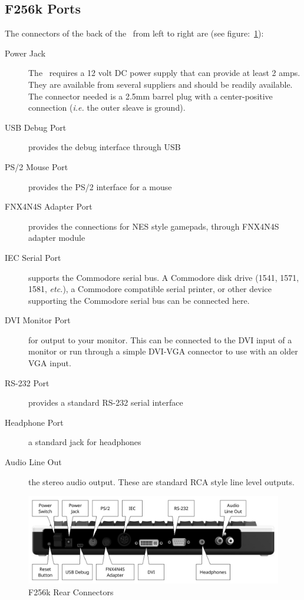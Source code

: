 \subsection*{F256k Ports}

The connectors of the back of the \fk\ from left to right are (see figure:~\ref{fig:rear_k}):

\begin{description}
	\item[Power Jack] The \fk\ requires a 12 volt DC power supply that can provide at least 2 amps. They are available from several suppliers and should be readily available. The connector needed is a 2.5mm barrel plug with a center-positive connection ({\it i.e.} the outer sleave is ground).
	
	\item[USB Debug Port] provides the debug interface through USB
    
    \item[PS/2 Mouse Port] provides the PS/2 interface for a mouse
    
    \item[FNX4N4S Adapter Port] provides the connections for NES style gamepads, through FNX4N4S adapter module
    
    \item[IEC Serial Port] supports the Commodore serial bus. A Commodore disk drive (1541, 1571, 1581, {\it etc.}), a Commodore compatible serial printer, or other device supporting the Commodore serial bus can be connected here.

    \item[DVI Monitor Port] for output to your monitor. This can be connected to the DVI input of a monitor or run through a simple DVI-VGA connector to use with an older VGA input.
    
    \item[RS-232 Port] provides a standard RS-232 serial interface
    
    \item[Headphone Port] a standard jack for headphones

    \item[Audio Line Out] the stereo audio output. These are standard RCA style line level outputs.
\end{description}

\begin{figure}[ht]
    \begin{center}
        \includegraphics[scale=0.75]{images/f256k_back_annotated.pdf}
    \end{center}
    \caption{F256k Rear Connectors}
    \label{fig:rear_k}
\end{figure}

